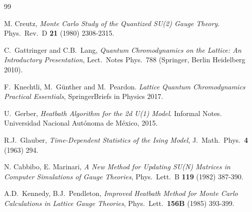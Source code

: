 \documentclass[12pt,a4paper]{article}
\begin{document}
\begin{thebibliography}{99}

   M. Creutz, \emph{Monte Carlo Study of the Quantized SU(2) Gauge Theory.} Phys.\ Rev.\ D {\bf 21} (1980) 2308-2315.

 C.\ Gattringer and C.B.\ Lang, \emph{Quantum Chromodynamics on the Lattice: An Introductory Presentation},  Lect.\ Notes Phys.\ 788 (Springer, Berlin Heidelberg 2010).

 F.\ Knechtli, M.\ Günther and M.\ Peardon. \emph{Lattice Quantum Chromodynamics Practical Essentials}, SpringerBriefs in Physics 2017.

 U.\ Gerber,
  \emph{Heatbath Algorithm for the 2d U(1) Model}.
  Informal Notes. Universidad Nacional Autónoma de México, 2015.  
  


 R.J.\ Glauber,
  \emph{Time-Dependent Statistics of the Ising Model},
  J.\ Math.\ Phys.\ {\bf 4} (1963) 294.
  

 N. Cabbibo, E. Marinari, \emph{A New Method for Updating SU(N) Matrices in Computer Simulations of Gauge Theories}, Phys.\ Lett.\ B {\bf 119} (1982) 387-390.

 A.D.\ Kennedy, B.J.\ Pendleton, \emph{Improved Heatbath Method for Monte Carlo Calculations in Lattice Gauge Theories}, Phys.\ Lett.\ {\bf 156B} (1985) 393-399.
\end{thebibliography}
\end{document}
